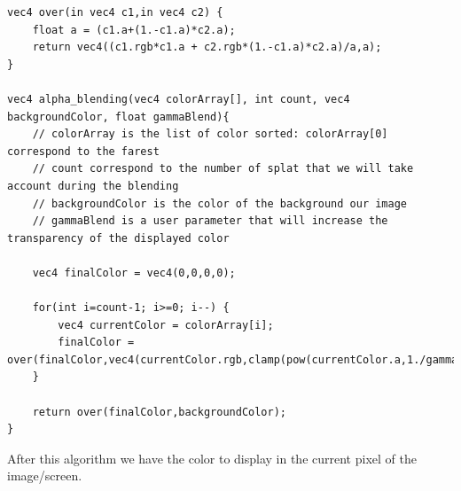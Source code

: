 \lstset{escapechar=@,style=customc}

\begin{lstlisting}
vec4 over(in vec4 c1,in vec4 c2) {
    float a = (c1.a+(1.-c1.a)*c2.a);
    return vec4((c1.rgb*c1.a + c2.rgb*(1.-c1.a)*c2.a)/a,a);
}

vec4 alpha_blending(vec4 colorArray[], int count, vec4 backgroundColor, float gammaBlend){
    // colorArray is the list of color sorted: colorArray[0] correspond to the farest
    // count correspond to the number of splat that we will take account during the blending
    // backgroundColor is the color of the background our image
    // gammaBlend is a user parameter that will increase the transparency of the displayed color

    vec4 finalColor = vec4(0,0,0,0);

    for(int i=count-1; i>=0; i--) {
        vec4 currentColor = colorArray[i];
        finalColor = over(finalColor,vec4(currentColor.rgb,clamp(pow(currentColor.a,1./gammaBlend),0.,1.)));
    }

    return over(finalColor,backgroundColor);
}
\end{lstlisting}

After this algorithm we have the color to display in the current pixel of the image/screen.


